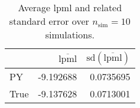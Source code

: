\begin{table}[H]

\caption{Average lpml and related standard error over $n_{\text{sim}} = 10$ simulations.}
\centering
\begin{tabular}[t]{lrr}
\toprule
  & $\overbar{\text{lpml}}$ & $\text{sd}(\overbar{\text{lpml}})$\\
\midrule
PY & -9.192688 & 0.0735695\\
True & -9.137628 & 0.0713001\\
\bottomrule
\end{tabular}
\end{table}
